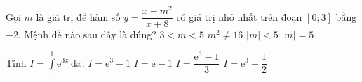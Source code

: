 \begin{ex}%
Gọi $m$ là giá trị để hàm số $y = \dfrac{x - m^2}{x + 8}$ có giá trị nhỏ nhất trên đoạn $[0;3]$ bằng $-2$. Mệnh đề nào sau đây là đúng?
\choice
{$3 < m < 5$}
{$m^2 \neq 16$}
{\True $|m| < 5$}
{$|m| = 5$}
\end{ex}

\begin{ex}%
Tính $I = \displaystyle\int\limits_{0}^{1} \mathrm{e}^{3x} \mathrm{\,d }x$.
\choice
{$I = \mathrm{e}^3-1$}
{$I = \mathrm{e}-1$}
{\True $I = \dfrac{\mathrm{e}^3-1}{3}$}
{$I = \mathrm{e}^3 + \dfrac{1}{2}$}
\end{ex}

